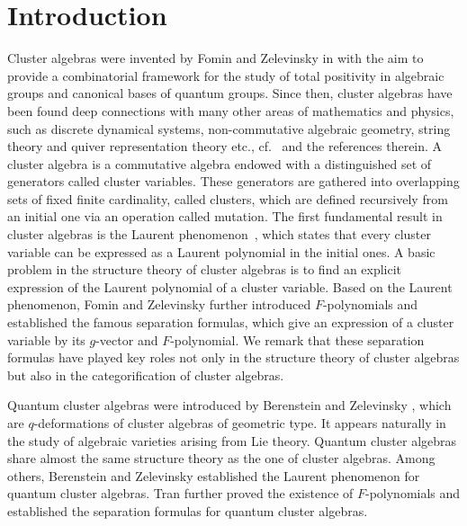 \documentclass[pdftex]{sigma}
\numberwithin{equation}{section}
\begin{document}
\section{Introduction}\label{S1}
Cluster algebras were invented by Fomin and Zelevinsky in \cite{fomin_zelevinsky_2002} with the aim to provide a combinatorial framework for the study of total positivity in algebraic groups and canonical bases of quantum groups. Since then, cluster algebras have been found deep connections with many other areas of mathematics and physics, such as discrete dynamical systems, non-commutative algebraic geometry, string theory and quiver representation theory etc., cf.\ \cite{Keller2012} and the references therein. A cluster algebra is a commutative algebra endowed with a distinguished set of generators called cluster variables. These generators are gathered into
overlapping sets of fixed finite cardinality, called clusters, which are defined recursively from an initial one via an operation called mutation. The first fundamental result in cluster algebras is the Laurent phenomenon~\cite{fomin_zelevinsky_2002}, which states that every cluster variable can be expressed as a Laurent polynomial in the initial ones. A basic problem in the structure theory of cluster algebras is to find an explicit expression of the Laurent polynomial of a cluster variable. Based on the Laurent phenomenon, Fomin and Zelevinsky \cite{fomin_zelevinsky_2007} further introduced $F$-polynomials and established the famous separation formulas, which give an expression of a cluster variable by its $g$-vector and $F$-polynomial. We remark that these separation formulas have played key roles not only in the structure theory of cluster algebras but also in the categorification of cluster algebras.

Quantum cluster algebras were introduced by Berenstein and Zelevinsky \cite{Berenstein_Zelevinsky2005}, which are $q$-deformations of cluster algebras of geometric type. It appears naturally in the study of algebraic varieties arising from Lie theory. Quantum cluster algebras share almost the same structure theory as the one of cluster algebras. Among others, Berenstein and Zelevinsky \cite{Berenstein_Zelevinsky2005} established the Laurent phenomenon for quantum cluster algebras. Tran \cite{Thao2011} further proved the existence of $F$-polynomials and established the separation formulas for quantum cluster algebras.
\end{document}
